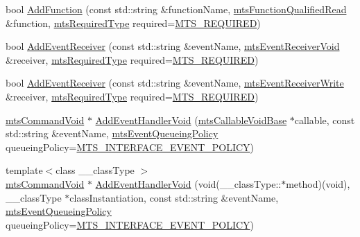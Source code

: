 \begin{DoxyCompactItemize}
\item 
bool \hyperlink{classmts_interface_required_ac547873315387815119d06ba2301c7c4}{Add\+Function} (const std\+::string \&function\+Name, \hyperlink{classmts_function_qualified_read}{mts\+Function\+Qualified\+Read} \&function, \hyperlink{mts_forward_declarations_8h_a9ef1ce54724afde7802db326ff8606f3}{mts\+Required\+Type} required=\hyperlink{mts_forward_declarations_8h_a9ef1ce54724afde7802db326ff8606f3ae01fd85391b60e546bbb1be9716c4ec9}{M\+T\+S\+\_\+\+R\+E\+Q\+U\+I\+R\+E\+D})
\item 
bool \hyperlink{classmts_interface_required_aa9146d63a8b06974615f36e01151e143}{Add\+Event\+Receiver} (const std\+::string \&event\+Name, \hyperlink{classmts_event_receiver_void}{mts\+Event\+Receiver\+Void} \&receiver, \hyperlink{mts_forward_declarations_8h_a9ef1ce54724afde7802db326ff8606f3}{mts\+Required\+Type} required=\hyperlink{mts_forward_declarations_8h_a9ef1ce54724afde7802db326ff8606f3ae01fd85391b60e546bbb1be9716c4ec9}{M\+T\+S\+\_\+\+R\+E\+Q\+U\+I\+R\+E\+D})
\item 
bool \hyperlink{classmts_interface_required_aff8e30bfcb14685dfa7082f7f6459cc6}{Add\+Event\+Receiver} (const std\+::string \&event\+Name, \hyperlink{classmts_event_receiver_write}{mts\+Event\+Receiver\+Write} \&receiver, \hyperlink{mts_forward_declarations_8h_a9ef1ce54724afde7802db326ff8606f3}{mts\+Required\+Type} required=\hyperlink{mts_forward_declarations_8h_a9ef1ce54724afde7802db326ff8606f3ae01fd85391b60e546bbb1be9716c4ec9}{M\+T\+S\+\_\+\+R\+E\+Q\+U\+I\+R\+E\+D})
\item 
\hyperlink{classmts_command_void}{mts\+Command\+Void} $\ast$ \hyperlink{classmts_interface_required_a195ee62f3fa85dbfd1ce92cb1f745603}{Add\+Event\+Handler\+Void} (\hyperlink{classmts_callable_void_base}{mts\+Callable\+Void\+Base} $\ast$callable, const std\+::string \&event\+Name, \hyperlink{mts_forward_declarations_8h_a9286ac2ca46e5bcd57059550faa96916}{mts\+Event\+Queueing\+Policy} queueing\+Policy=\hyperlink{mts_forward_declarations_8h_a9286ac2ca46e5bcd57059550faa96916a3d4338e85690d50e9ab167be77cdefa0}{M\+T\+S\+\_\+\+I\+N\+T\+E\+R\+F\+A\+C\+E\+\_\+\+E\+V\+E\+N\+T\+\_\+\+P\+O\+L\+I\+C\+Y})
\item 
{\footnotesize template$<$class \+\_\+\+\_\+class\+Type $>$ }\\\hyperlink{classmts_command_void}{mts\+Command\+Void} $\ast$ \hyperlink{classmts_interface_required_a49e6b415fd639fc8ddfea29bc99e698d}{Add\+Event\+Handler\+Void} (void(\+\_\+\+\_\+class\+Type\+::$\ast$method)(void), \+\_\+\+\_\+class\+Type $\ast$class\+Instantiation, const std\+::string \&event\+Name, \hyperlink{mts_forward_declarations_8h_a9286ac2ca46e5bcd57059550faa96916}{mts\+Event\+Queueing\+Policy} queueing\+Policy=\hyperlink{mts_forward_declarations_8h_a9286ac2ca46e5bcd57059550faa96916a3d4338e85690d50e9ab167be77cdefa0}{M\+T\+S\+\_\+\+I\+N\+T\+E\+R\+F\+A\+C\+E\+\_\+\+E\+V\+E\+N\+T\+\_\+\+P\+O\+L\+I\+C\+Y})

\end{DoxyCompactItemize}
